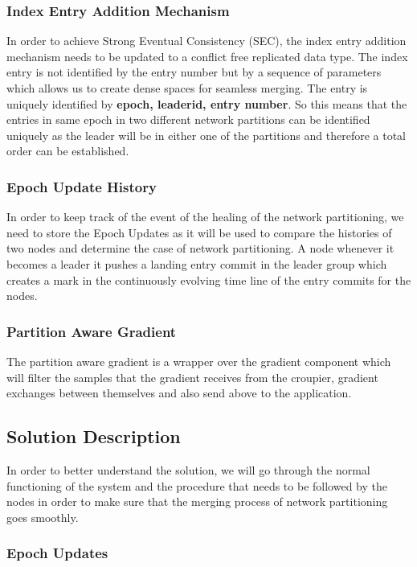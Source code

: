\documentclass[a4paper, 11pt]{article}
\begin{document}
\subsubsection{Index Entry Addition Mechanism} In order to achieve Strong Eventual Consistency (SEC), the index entry addition mechanism needs to be updated to a conflict free replicated data type. The index entry is not identified by the entry number but by a sequence of parameters which allows us to create dense spaces for seamless merging.
The entry is uniquely identified by \textbf{epoch, leaderid, entry number}. So this means that the entries in same epoch in two different network partitions can be identified uniquely as the leader will be in either one of the partitions and therefore a total order can be established.


\subsubsection{Epoch Update History} In order to keep track of the event of the healing of the network partitioning, we need to store the Epoch Updates as it will be used to compare the histories of two nodes and determine the case of network partitioning. A node whenever it becomes a leader it pushes a landing entry commit in the leader group which creates a mark in the continuously evolving time line of the entry commits for the nodes.


\subsubsection{Partition Aware Gradient} The partition aware gradient is a wrapper over the gradient component which will filter the samples that the gradient receives from the croupier, gradient exchanges between themselves and also send above to the application.



\subsection{Solution Description}
In order to better understand the solution, we will go through the normal functioning of the system and the procedure that needs to be followed by the nodes in order to make sure that the merging process of network partitioning goes smoothly.

\subsubsection{Epoch Updates}
\end{document}
